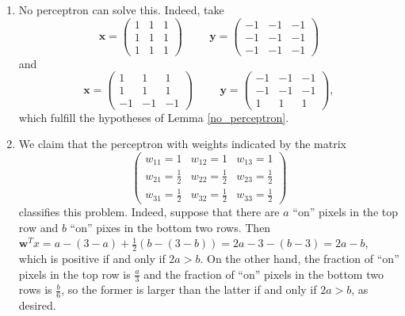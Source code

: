 \documentclass[12pt]{amsart}
\newcommand{\mbf}[1]{\mathbf{#1}}
\theoremstyle{remark}
\begin{document}
\begin{enumerate}
\item No perceptron can solve this. Indeed, take 
\[
\mbf{x} = \begin{pmatrix} 1 & 1 & 1 \\ 1 & 1 & 1 \\ 1 & 1 & 1 \end{pmatrix} \hspace{1cm} \mbf{y} = \begin{pmatrix} -1 & -1 & -1 \\ -1 & -1 & -1 \\ -1 & -1 & -1 \end{pmatrix} 
\]
 and  
\[
\mbf{x} = \begin{pmatrix} 1 & 1 & 1 \\ 1 & 1 & 1 \\ -1 & -1 & -1 \end{pmatrix} \hspace{1cm} \mbf{y} = \begin{pmatrix} -1 & -1 & -1 \\ -1 & -1 & -1 \\ 1 & 1 & 1 \end{pmatrix} ,
\]
which fulfill the hypotheses of Lemma \ref{no_perceptron}.

\item We claim that the perceptron with weights indicated by the matrix
\[
\begin{pmatrix} w_{11} = 1 & w_{12} = 1 & w_{13} = 1 \\ w_{21} = \frac{1}{2} & w_{22} = \frac{1}{2} &  w_{23} = \frac{1}{2}  \\ w_{31} = \frac{1}{2} & w_{32} = \frac{1}{2} & w_{33} = \frac{1}{2}  \end{pmatrix}
\]
classifies this problem. Indeed, suppose that there are $a$ ``on'' pixels in the top row and $b$ ``on'' pixes in the bottom two rows. Then $\mbf{w}^T  x = a - (3-a) + \frac{1}{2} (b - (3-b)) = 2a-3  - (b-3) = 2a - b$, which is positive if and only if $2a > b$. On the other hand, the fraction of ``on'' pixels in the top row is $\frac{a}{3}$ and the fraction of ``on'' pixels in the bottom two rows is $\frac{b}{6}$, so the former is larger than the latter if and only if $2a > b$, as desired. 


\end{enumerate}
\end{document}
